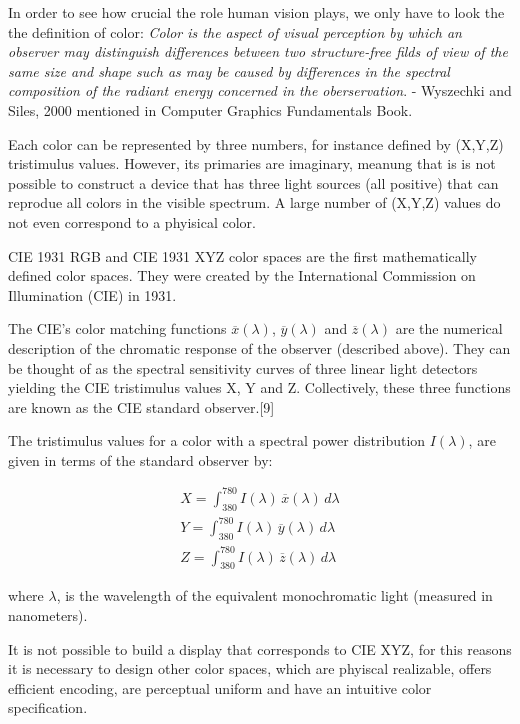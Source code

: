 In order to see how crucial the role human vision plays, we only have to look the the definition of color: 
\textit{Color is the aspect of visual perception by which an observer may distinguish differences between two structure-free filds of view of the same size and shape such as may be caused by differences in the spectral composition of the radiant energy concerned in the oberservation}. -  Wyszechki and Siles, 2000 mentioned in Computer Graphics Fundamentals Book. 

Each color can be represented by three numbers, for instance defined by (X,Y,Z) tristimulus values. However, its primaries are imaginary, meanung that is is not possible to construct a device that has three light sources (all positive) that can reprodue all colors in the visible spectrum. A large number of (X,Y,Z) values do not even correspond to a phyisical color. 

CIE 1931 RGB and CIE 1931 XYZ color spaces are the first mathematically defined color spaces. They were created by the International Commission on Illumination (CIE) in 1931.

The CIE's color matching functions $\overline{x}(\lambda)$, $\overline{y}(\lambda)$ and $\overline{z}(\lambda)$ are the numerical description of the chromatic response of the observer (described above). They can be thought of as the spectral sensitivity curves of three linear light detectors yielding the CIE tristimulus values X, Y and Z. Collectively, these three functions are known as the CIE standard observer.[9]

The tristimulus values for a color with a spectral power distribution $I(\lambda)$, are given in terms of the standard observer by:

\begin{align*}
    X= \int_{380}^{780} I(\lambda)\,\overline{x}(\lambda)\,d\lambda \\
    Y= \int_{380}^{780} I(\lambda)\,\overline{y}(\lambda)\,d\lambda \\
    Z= \int_{380}^{780} I(\lambda)\,\overline{z}(\lambda)\,d\lambda
\end{align*}

where $\lambda$, is the wavelength of the equivalent monochromatic light (measured in nanometers).

It is not possible to build a display that corresponds to CIE XYZ, for this reasons it is necessary to design  other color spaces, which are phyiscal realizable, offers efficient encoding, are perceptual uniform and have an intuitive color specification. 


